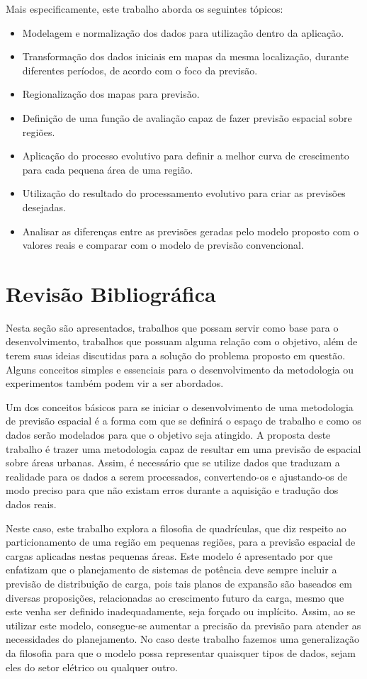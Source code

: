 Mais especificamente, este trabalho aborda os seguintes tópicos:
\begin{itemize}
\item Modelagem e normalização dos dados para utilização dentro da aplicação.
\item Transformação dos dados iniciais em mapas da mesma localização, durante diferentes períodos, de acordo com o foco da previsão.
\item Regionalização dos mapas para previsão.
\item Definição de uma função de avaliação capaz de fazer previsão espacial sobre regiões.
\item Aplicação do processo evolutivo para definir a melhor curva de crescimento para cada pequena área de uma região.
\item Utilização do resultado do processamento evolutivo para criar as previsões desejadas.
\item Analisar as diferenças entre as previsões geradas pelo modelo proposto com o valores reais e comparar com o modelo de previsão convencional. 
\end{itemize}

\section{Revisão Bibliográfica}
Nesta seção são apresentados, trabalhos que possam servir como base para o desenvolvimento, trabalhos que possuam alguma relação com o objetivo, além de terem suas ideias discutidas para a solução do problema proposto em questão. Alguns conceitos simples e essenciais para o desenvolvimento da metodologia ou experimentos também podem vir a ser abordados.

Um dos conceitos básicos para se iniciar o desenvolvimento de uma metodologia de previsão espacial é a forma com que se definirá o espaço de trabalho e como os dados serão modelados para que o objetivo seja atingido. A proposta deste trabalho é trazer uma metodologia capaz de resultar em uma previsão de espacial sobre áreas urbanas. Assim, é necessário que se utilize dados que traduzam a realidade para os dados a serem processados, convertendo-os e ajustando-os de modo preciso para que não existam erros durante a aquisição e tradução dos dados reais.

Neste caso, este trabalho explora a filosofia de quadrículas, que diz respeito ao particionamento de uma região em pequenas regiões, para a previsão espacial de cargas aplicadas nestas pequenas áreas. Este modelo é apresentado por \citeauthor{willis2002spatial} \cite{willis2002spatial} que enfatizam que o planejamento de sistemas de potência deve sempre incluir a previsão de distribuição de carga, pois tais planos de expansão são baseados em diversas proposições, relacionadas ao crescimento futuro da carga, mesmo que este venha ser definido inadequadamente, seja forçado ou implícito. Assim, ao se utilizar este modelo, consegue-se aumentar a precisão da previsão para atender as necessidades do planejamento. No caso deste trabalho fazemos uma generalização da filosofia para que o modelo possa representar quaisquer tipos de dados, sejam eles do setor elétrico ou qualquer outro.

